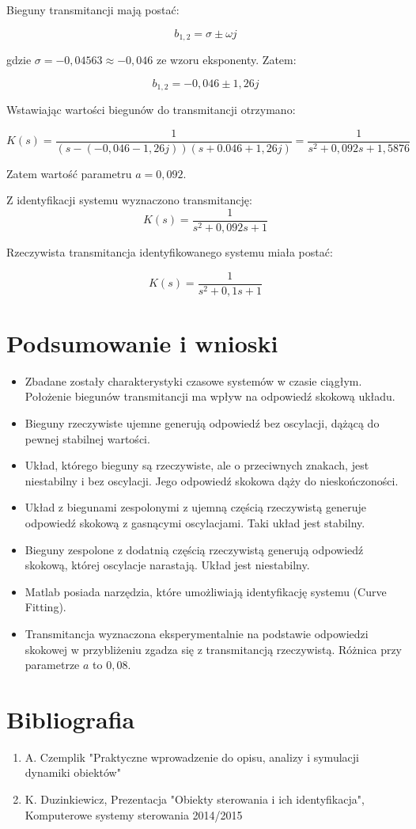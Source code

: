 \documentclass[12pt]{article}
\begin{document}
Bieguny transmitancji mają postać:

\begin{equation}
    b_{1,2} = \sigma \pm \omega j
\end{equation}

gdzie $\sigma = -0,04563 \approx -0,046$ ze wzoru eksponenty. Zatem:

\begin{equation}
    b_{1,2} = -0,046 \pm 1,26j
\end{equation}

Wstawiając wartości biegunów do transmitancji otrzymano:

\begin{equation}
    K(s) = \frac{1}{(s- (-0,046 - 1,26j))(s+0.046 + 1,26j)} = \frac{1}{s^2+0,092s+1,5876}
\end{equation}

Zatem wartość parametru $a = 0,092$.

Z identyfikacji systemu wyznaczono transmitancję:
\begin{equation}
    K(s) = \frac{1}{s^2+0,092s+1}
\end{equation}

Rzeczywista transmitancja identyfikowanego systemu miała postać:

\begin{equation}
    K(s) = \frac{1}{s^2+0,1s+1}
\end{equation}

\section{Podsumowanie i wnioski}
\begin{itemize}
    \item Zbadane zostały charakterystyki czasowe systemów w czasie ciągłym. Położenie biegunów transmitancji ma wpływ na odpowiedź skokową układu. 
    \item Bieguny rzeczywiste ujemne generują odpowiedź bez oscylacji, dążącą do pewnej stabilnej wartości. 
    \item Układ, którego bieguny są rzeczywiste, ale o przeciwnych znakach, jest niestabilny i bez oscylacji. Jego odpowiedź skokowa dąży do nieskończoności. 
    \item Układ z biegunami zespolonymi z ujemną częścią rzeczywistą generuje odpowiedź skokową z gasnącymi oscylacjami. Taki układ jest stabilny. 
    \item Bieguny zespolone z dodatnią częścią rzeczywistą generują odpowiedź skokową, której oscylacje narastają. Układ jest niestabilny.
    \item Matlab posiada narzędzia, które umożliwiają identyfikację systemu (Curve Fitting).
    \item Transmitancja wyznaczona eksperymentalnie na podstawie odpowiedzi skokowej w przybliżeniu zgadza się z transmitancją rzeczywistą. Różnica przy parametrze $a$ to $0,08$.
\end{itemize}

\section{Bibliografia}
\begin{enumerate}
    \item A. Czemplik "Praktyczne wprowadzenie do opisu, analizy i symulacji dynamiki obiektów"
    \item K. Duzinkiewicz, Prezentacja "Obiekty sterowania i ich identyfikacja", Komputerowe systemy sterowania 2014/2015 
\end{enumerate}
\end{document}
